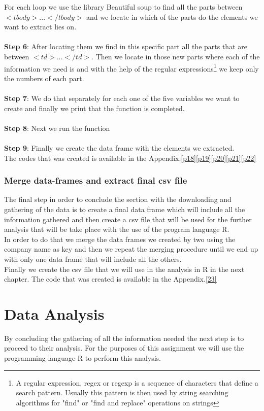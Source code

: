 \documentclass{article}
\begin{document}
For each loop we use the library Beautiful soup to find all the parts between $<tbody>...</tbody>$ and we locate in which of the parts do the elements we want to extract lies on.\\\\
\textbf{Step 6}: After locating them we find in this specific part all the parts that are between $<td>...</td>$. Then we locate in those new parts where each of the information we need is and with the help of the regular expressions\footnote{A regular expression, regex or regexp is  a sequence of characters that define a search pattern. Usually this pattern is then used by string searching algorithms for "find" or "find and replace" operations on strings} we keep only the numbers of each part.\\\\\textbf{Step 7}: We do that separately for each one of the five variables we want to create and finally we print that the function is completed.\\\\
\textbf{Step 8}: Next we run the function\\\\
\textbf{Step 9}: Finally we create the data frame with the elements we extracted.\\
The codes that was created is available in the Appendix.\ref{p18}\ref{p19}\ref{p20}\ref{p21}\ref{p22} 


\subsubsection{Merge data-frames and extract final csv file}
The final step in order to conclude the section with the downloading and gathering of the data is to create a final data frame which will include all the information gathered and then create a csv file that will be used for the further analysis that will be take place with the use of the program language R.\\
In order to do that we merge the data frames we created by two using the company name as key and then we repeat the merging procedure until we end up with only one data frame that will include all the others.\\
Finally we create the csv file that we will use in the analysis in R in the next chapter. The code that was created is available in the Appendix.\ref{23}

\newpage  
\section{Data Analysis}
By concluding the gathering of all the information needed the next step is to proceed to their analysis. For the purposes of this assignment we will use the programming language R to perform this analysis.\cite{key1}
\end{document}

